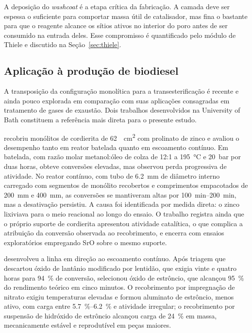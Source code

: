 A deposição do \textit{washcoat} é a etapa crítica da fabricação. A camada deve
ser espessa o suficiente para comportar massa útil de catalisador, mas fina o
bastante para que o reagente alcance os sítios ativos no interior do poro antes
de ser consumido na entrada deles. Esse compromisso é quantificado pelo módulo
de Thiele e discutido na Seção~\ref{sec:thiele}.

\subsection{Aplicação à produção de biodiesel}

A transposição da configuração monolítica para a transesterificação é recente e
ainda pouco explorada em comparação com suas aplicações consagradas em
tratamento de gases de exaustão. Dois trabalhos desenvolvidos na University of
Bath constituem a referência mais direta para o presente estudo.

\textcite{Asli2011} recobriu monólitos de cordierita de \SI{62}{\per\centi\meter\squared}
com prolinato de zinco e avaliou o desempenho tanto em reator batelada quanto
em escoamento contínuo. Em batelada, com razão molar metanol:óleo de colza de
\num{12}:\num{1} a \SI{195}{\celsius} e \SI{20}{\bar} por duas horas, obteve
conversões elevadas, mas observou perda progressiva de atividade. No reator
contínuo, com tubo de \SI{6.2}{\milli\meter} de diâmetro interno carregado com
segmentos de monólito recobertos e comprimentos empacotados de \SI{200}{\milli\meter} e
\SI{400}{\milli\meter}, as conversões se mantiveram altas por \SIrange{100}{200}{\minute},
mas a desativação persistiu. A causa foi identificada por medida direta: o zinco
lixiviava para o meio reacional ao longo do ensaio. O trabalho registra ainda
que o próprio suporte de cordierita apresentou atividade catalítica, o que
complica a atribuição da conversão observada ao recobrimento, e encerra com
ensaios exploratórios empregando SrO sobre o mesmo suporte.

\textcite{Firth2014} desenvolveu a linha em direção ao escoamento contínuo.
Após triagem que descartou óxido de lantânio modificado por lentidão,
que exigia vinte e quatro horas para \SI{94}{\percent} de conversão, selecionou
óxido de estrôncio, que alcançou \SI{95}{\percent} do rendimento teórico em
cinco minutos. O recobrimento por impregnação de nitrato exigiu temperaturas
elevadas e formou aluminato de estrôncio, menos ativo, com carga entre
\SIrange{5.7}{6.2}{\percent} e atividade irregular; o recobrimento por
suspensão de hidróxido de estrôncio alcançou carga de \SI{24}{\percent} em
massa, mecanicamente estável e reprodutível em peças maiores.

